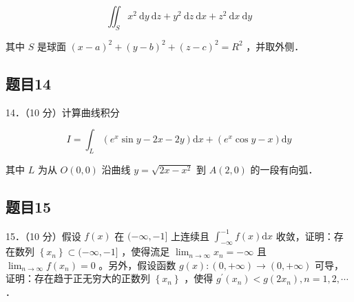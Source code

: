 \documentclass{article}
\begin{document}
\[
\iint_{S} x^{2} \mathrm{~d} y \mathrm{~d} z+y^{2} \mathrm{~d} z \mathrm{~d} x+z^{2} \mathrm{~d} x \mathrm{~d} y
\]

其中 \(S\) 是球面 \((x-a)^{2}+(y-b)^{2}+(z-c)^{2}=R^{2}\) ，并取外侧．

\subsection{题目14}
14．（10 分）计算曲线积分

\[
I=\int_{L}\left(e^{x} \sin y-2 x-2 y\right) \mathrm{d} x+\left(e^{x} \cos y-x\right) \mathrm{d} y
\]

其中 \(L\) 为从 \(O(0,0)\) 沿曲线 \(y=\sqrt{2 x-x^{2}}\) 到 \(A(2,0)\) 的一段有向弧．

\subsection{题目15}
15．（10 分）假设 \(f(x)\) 在 \((-\infty,-1]\) 上连续且 \(\int_{-\infty}^{-1} f(x) \mathrm{d} x\) 收敛，证明：存在数列 \(\left\{x_{n}\right\} \subset(-\infty,-1]\) ，使得流足 \(\lim _{n \rightarrow \infty} x_{n}=-\infty\) 且 \(\lim _{n \rightarrow \infty} f\left(x_{n}\right)=0\) 。另外，假设函数 \(g(x):(0,+\infty) \rightarrow(0,+\infty)\) 可导，证明：存在趋于正无穷大的正数列 \(\left\{x_{n}\right\}\) ，使得 \(g^{\prime}\left(x_{n}\right)<g\left(2 x_{n}\right), n=1,2, \cdots\) ．
\end{document}
